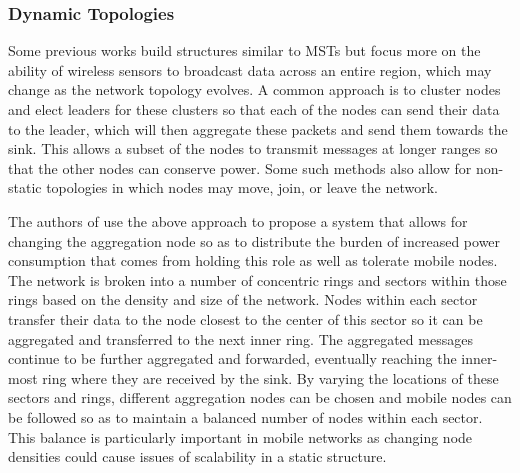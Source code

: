 \documentclass{IEEEtran}
\begin{document}
\subsubsection{Dynamic Topologies}

Some previous works build structures similar to MSTs but focus more on the ability of wireless sensors to broadcast data across an entire region, which may change as the network topology evolves.  A common approach is to cluster nodes and elect leaders for these clusters so that each of the nodes can send their data to the leader, which will then aggregate these packets and send them towards the sink.  This allows a subset of the nodes to transmit messages at longer ranges so that the other nodes can conserve power.  Some such methods also allow for non-static topologies in which nodes may move, join, or leave the network.

The authors of \cite{sct} use the above approach to propose a system that allows for changing the aggregation node so as to distribute the burden of increased power consumption that comes from holding this role as well as tolerate mobile nodes.  The network is broken into a number of concentric rings and sectors within those rings based on the density and size of the network.  Nodes within each sector transfer their data to the node closest to the center of this sector so it can be aggregated and transferred to the next inner ring. The aggregated messages continue to be further aggregated and forwarded, eventually reaching the inner-most ring where they are received by the sink. By varying the locations of these sectors and rings, different aggregation nodes can be chosen and mobile nodes can be followed so as to maintain a balanced number of nodes within each sector.  This balance is particularly important in mobile networks as changing node densities could cause issues of scalability in a static structure.
\end{document}
